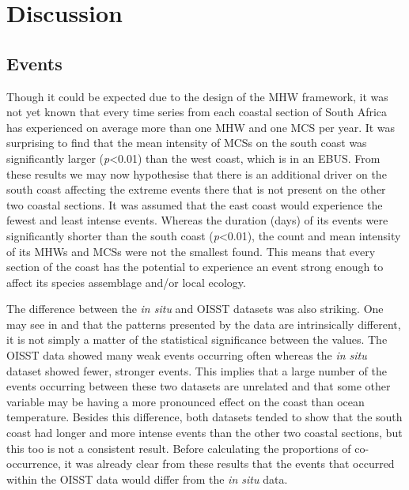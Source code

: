 \documentclass[a4paper,10pt,review]{elsarticle}
\begin{document}
\section{Discussion}

\subsection{Events}
Though it could be expected due to the design of the \citet{Hobday2016} MHW framework, it was not yet known that every time series from each coastal section of South Africa has experienced on average more than one MHW and one MCS per year. It was surprising to find that the mean intensity of MCSs on the south coast was significantly larger (\emph{p}<0.01) than the west coast, which is in an EBUS. From these results we may now hypothesise that there is an additional driver on the south coast affecting the extreme events there that is not present on the other two coastal sections. It was assumed that the east coast would experience the fewest and least intense events. Whereas the duration (days) of its events were significantly shorter than the south coast (\emph{p}<0.01), the count and mean intensity of its MHWs and MCSs were not the smallest found. This means that every section of the coast has the potential to experience an event strong enough to affect its species assemblage and/or local ecology.

The difference between the \emph{in situ} and OISST datasets was also striking. One may see in  and  that the patterns presented by the data are intrinsically different, it is not simply a matter of the statistical significance between the values. The OISST data showed many weak events occurring often whereas the \emph{in situ} dataset showed fewer, stronger events. This implies that a large number of the events occurring between these two datasets are unrelated and that some other variable may be having a more pronounced effect on the coast than ocean temperature. Besides this difference, both datasets tended to show that the south coast had longer and more intense events than the other two coastal sections, but this too is not a consistent result. Before calculating the proportions of co-occurrence, it was already clear from these results that the events that occurred within the OISST data would differ from the \emph{in situ} data.
\end{document}
